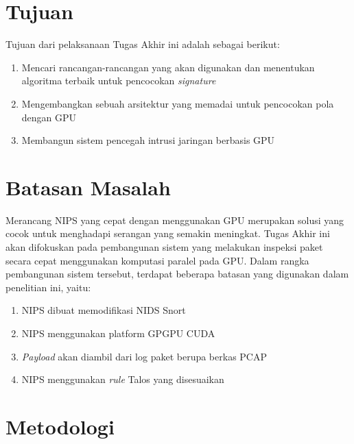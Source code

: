 \section{Tujuan}

  Tujuan dari pelaksanaan Tugas Akhir ini adalah sebagai berikut:
  \begin{enumerate}
      \item Mencari rancangan-rancangan yang akan digunakan dan menentukan algoritma terbaik untuk pencocokan \emph{signature}
      \item Mengembangkan sebuah arsitektur yang memadai untuk pencocokan pola dengan GPU
      \item Membangun sistem pencegah intrusi jaringan berbasis GPU
  \end{enumerate}

\section{Batasan Masalah}

  Merancang NIPS yang cepat dengan menggunakan GPU merupakan solusi yang cocok untuk menghadapi serangan yang semakin meningkat. Tugas Akhir ini akan difokuskan pada pembangunan sistem yang melakukan inspeksi paket secara cepat menggunakan komputasi paralel pada GPU. Dalam rangka pembangunan sistem tersebut, terdapat beberapa batasan yang digunakan dalam penelitian ini, yaitu:
  \begin{enumerate}
      \item NIPS dibuat memodifikasi NIDS Snort
      \item NIPS menggunakan platform GPGPU CUDA
      \item \emph{Payload} akan diambil dari log paket berupa berkas PCAP
      \item NIPS menggunakan \emph{rule} Talos yang disesuaikan
  \end{enumerate}

\section{Metodologi}

